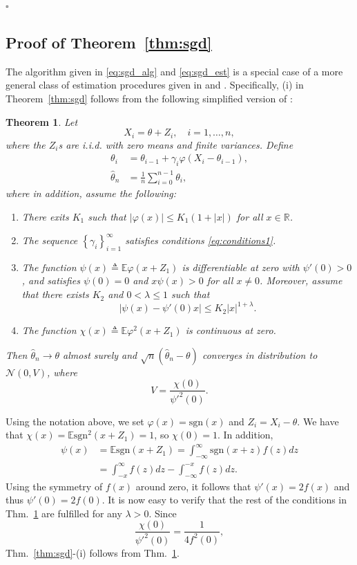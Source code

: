 \documentclass[letterpaper, conference, 11pt]{IEEEtran}      %
\newtheorem{thm}{\bf{Theorem}}
\newcommand{\sgn}{\mathrm{sgn} }
\newcommand*{\QEDA}{\hfill\ensuremath{\square}}
\begin{document}
\QEDA

\subsection*{Proof of Theorem~\ref{thm:sgd}}
The algorithm given in \eqref{eq:sgd_alg} and \eqref{eq:sgd_est} is a special case of a more general class of estimation procedures given in \cite{polyak1992acceleration} and \cite{polyak1990new}. Specifically, (i) in Theorem~\ref{thm:sgd} follows from the following simplified version of \cite[Thm. 4]{polyak1992acceleration}:
\begin{thm}{\cite[Thm. 4]{polyak1992acceleration}} \label{thm:polyak_juditsky}
Let 
\[
X_i = \theta + Z_i,\quad i=1,\ldots,n,
\]
where the $Z_i$s are i.i.d. with zero means and finite variances. Define
\begin{align*}
\theta_i & = \theta_{i-1} + \gamma_i \varphi(X_i - \theta_{i-1}), \\
\hat{\theta}_n & = \frac{1}{n} \sum_{i=0}^{n-1} \theta_i, 
\end{align*}
where in addition, assume the following: 
\begin{enumerate}
\item[(i)] There exits $K_1$ such that $\left| \varphi(x) \right| \leq K_1(1+|x|)$ for all $x\in \mathbb R$.
\item[(ii)] The sequence $\left\{ \gamma_i \right\}_{i=1}^\infty$ satisfies conditions \eqref{eq:conditions1}.
\item[(iii)] The function $\psi(x) \triangleq \mathbb E \varphi(x+Z_1)$ is differentiable at zero with $\psi'(0)>0$, and satisfies $\psi(0)=0$ and $x\psi(x) >0$ for all $x\neq 0$.
Moreover, assume that there exists $K_2$ and $0<\lambda \leq 1$ such that
\begin{equation}
\label{eq:Polyak_Juditsky_cond3}
\left| \psi(x) - \psi'(0)x \right|\leq K_2 |x|^{1+\lambda}.
\end{equation}
\item[(iv)] The function 
$\chi(x) \triangleq \mathbb E \varphi^2(x+Z_1)$ is continuous at zero. 
\end{enumerate}
Then $\hat{\theta}_n \rightarrow \theta$ almost surely and $ \sqrt{n}(\hat{\theta}_n - \theta)$ converges in distribution to $\mathcal N(0,V)$, where
\[
V = \frac{ \chi(0)} {\psi'^2(0)}. 
\]
\end{thm}

Using the notation above, we set $\varphi(x) = \sgn(x)$ and $Z_i = X_i - \theta$. We have that $\chi(x) = \mathbb E \sgn^2(x+Z_1) = 1$, so $\chi(0) = 1$. In addition,
\begin{align*}
\psi(x) & = \mathbb E \sgn(x+ Z_1) = \int_{-\infty}^\infty \sgn(x+z) f(z) dz \\
& = \int_{-x}^\infty f(z) dz -\int_{-\infty}^{-x} f(z) dz. 
\end{align*}
Using the symmetry of $f(x)$ around zero, it follows that $\psi'(x) = 2f(x)$ and thus $\psi'(0) = 2f(0)$. It is now easy to verify that the rest of the conditions in Thm.~\ref{thm:polyak_juditsky} are fulfilled for any $\lambda > 0$. Since 
\[
\frac{\chi(0)}{\psi'^2(0)} = \frac{1}{4 f^2(0)},
\]
Thm.~\ref{thm:sgd}-(i) follows from Thm.~\ref{thm:polyak_juditsky}.  \\
\end{document}
